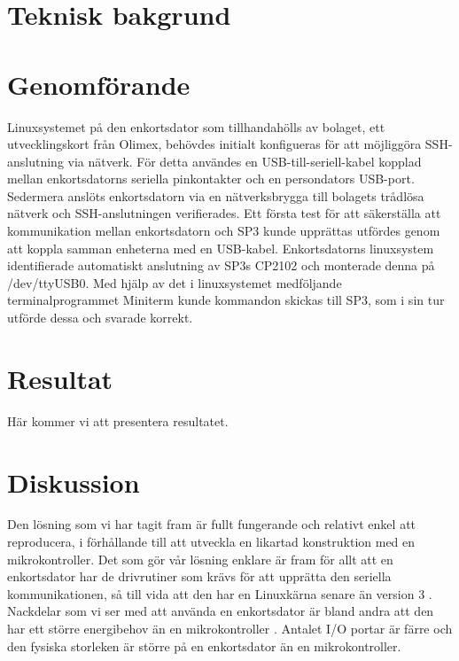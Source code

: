 \documentclass{article}
\begin{document}
	\section{Teknisk bakgrund} %
	\label{sec:teknisk_bakgrund}
	


	\section{Genomförande} %
	\label{sec:genomf_rande}
		Linuxsystemet på den enkortsdator som tillhandahölls av bolaget, ett utvecklingskort från Olimex, behövdes initialt konfigueras för att möjliggöra SSH-anslutning via nätverk. För detta användes en USB-till-seriell-kabel kopplad mellan enkortsdatorns seriella pinkontakter och en persondators USB-port. Sedermera anslöts enkortsdatorn via en nätverksbrygga till bolagets trådlösa nätverk och SSH-anslutningen verifierades. Ett första test för att säkerställa att kommunikation mellan enkortsdatorn och SP3 kunde upprättas utfördes genom att koppla samman enheterna med en USB-kabel. Enkortsdatorns linuxsystem identifierade automatiskt anslutning av SP3s CP2102 och monterade denna på /dev/ttyUSB0. Med hjälp av det i linuxsystemet medföljande terminalprogrammet Miniterm kunde kommandon skickas till SP3, som i sin tur utförde dessa och svarade korrekt.

	\section{Resultat} %
	\label{sec:resultat}
	Här kommer vi att presentera resultatet. \\

	\section{Diskussion} %
	\label{sec:sammanfattning}
		Den lösning som vi har tagit fram är fullt fungerande och relativt enkel att reproducera, i förhållande till att utveckla en likartad konstruktion med en mikrokontroller. Det som gör vår lösning enklare är fram för allt att en enkortsdator har de drivrutiner som krävs för att upprätta den seriella kommunikationen, så till vida att den har en Linuxkärna senare än version 3 \citep{silicon}. \\


		\noindent Nackdelar som vi ser med att använda en enkortsdator är bland andra att den har ett större energibehov än en mikrokontroller \citep{gadgetBlog} \citep{rasp}. Antalet I/O portar är färre och den fysiska storleken är större på en enkortsdator än en mikrokontroller.\\
\end{document}
